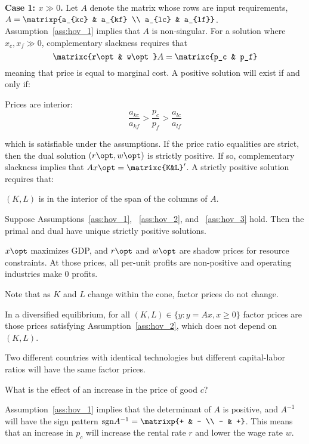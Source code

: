 \documentclass[10pt]{article}
\begin{document}
\textbf{Case 1: $x \gg 0$.} Let $A$ denote the matrix whose rows are input requirements, $A = \matrixp{a_{kc} & a_{kf} \\ a_{lc} & a_{lf}}$. Assumption~\ref{ass:hov_1} implies that $A$ is non-singular. For a solution where $x_c,x_f \gg 0$, complementary slackness requires that \[\matrixc{r\opt & w\opt}A = \matrixc{p_c & p_f}\]meaning that price is equal to marginal cost. A positive solution will exist if and only if:
\begin{assumption}\label{ass:hov_2}
	Prices are interior: \[\frac{a_{kc}}{a_{kf}} > \frac{p_c}{p_f} > \frac{a_{lc}}{a_{lf}}\]
\end{assumption}
which is satisfiable under the assumptions. If the price ratio equalities are strict, then the dual solution $(r\opt,w\opt)$ is strictly positive. If so, complementary slackness implies that $Ax\opt = \matrixc{K&L}'$. A strictly positive solution requires that:
\begin{assumption}\label{ass:hov_3} $(K,L)$ is in the interior of the span of the columns of $A$.	
\end{assumption}


\begin{theorem}
	Suppose Assumptions~\ref{ass:hov_1}, ~\ref{ass:hov_2}, and ~\ref{ass:hov_3} hold. Then the primal and dual have unique strictly positive solutions.
\end{theorem}
\begin{remark}
	$x\opt$ maximizes GDP, and $r\opt$ and $w\opt$ are shadow prices for resource constraints. At those prices, all per-unit profits are non-positive and operating industries make 0 profits.
\end{remark}

Note that as $K$ and $L$ change within the cone, factor prices do not change.

\begin{theorem}
	 In a diversified equilibrium, for all $(K,L) \in \{y : y = Ax,x\ge 0\}$ factor prices are those prices satisfying Assumption~\ref{ass:hov_2}, which does not depend on $(K,L)$.
\end{theorem}
\begin{remark}
	Two different countries with identical technologies but different capital-labor ratios will have the same factor prices.
\end{remark}

\begin{question}
	What is the effect of an increase in the price of good $c$?
\end{question}
\begin{answer}
	Assumption~\ref{ass:hov_1} implies that the determinant of $A$ is positive, and $A^{-1}$ will have the sign pattern $\text{sgn} A^{-1} = \matrixp{+ & - \\ - & +}$. This means that an increase in $p_c$ will increase the rental rate $r$ and lower the wage rate $w$. 
\end{answer}
\end{document}

